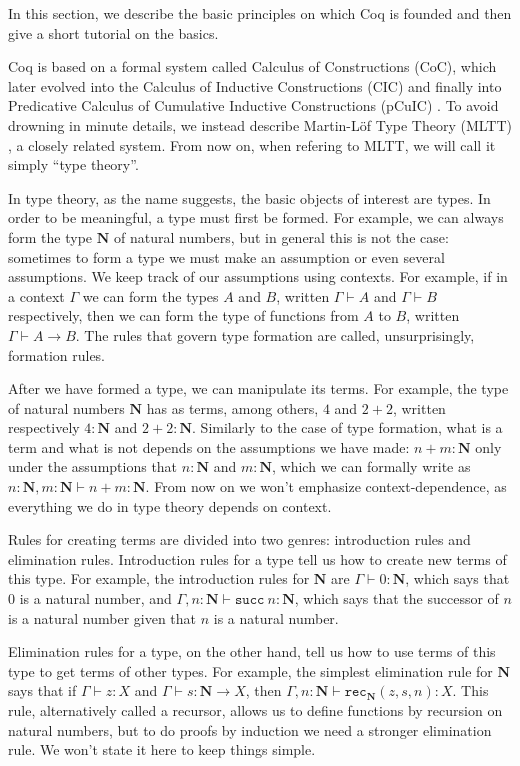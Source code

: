 \documentclass[declaration,mgr,english,shortabstract]{iithesis}
\newcommand{\m}[1]{\texttt{#1}}
\newcommand{\N}{\mathbf{N}}
\begin{document}
In this section, we describe the basic principles on which Coq is founded and then give a short tutorial on the basics.

Coq is based on a formal system called Calculus of Constructions (CoC)\cite{CoC}, which later evolved into the Calculus of Inductive Constructions (CIC) \cite{CIC} and finally into Predicative Calculus of Cumulative Inductive Constructions (pCuIC) \cite{pCuIC}. To avoid drowning in minute details, we instead describe Martin-L\"{o}f Type Theory (MLTT) \cite{MLTT1} \cite{MLTT2}, a closely related system. From now on, when refering to MLTT, we will call it simply ``type theory''.

In type theory, as the name suggests, the basic objects of interest are types. In order to be meaningful, a type must first be formed. For example, we can always form the type $\N$ of natural numbers, but in general this is not the case: sometimes to form a type we must make an assumption or even several assumptions. We keep track of our assumptions using contexts. For example, if in a context $\Gamma$ we can form the types $A$ and $B$, written $\Gamma \vdash A$ and $\Gamma \vdash B$ respectively, then we can form the type of functions from $A$ to $B$, written $\Gamma \vdash A \to B$. The rules that govern type formation are called, unsurprisingly, formation rules.

After we have formed a type, we can manipulate its terms. For example, the type of natural numbers $\N$ has as terms, among others, $4$ and $2 + 2$, written respectively $4 : \N$ and $2 + 2 : \N$. Similarly to the case of type formation, what is a term and what is not depends on the assumptions we have made: $n + m : \N$ only under the assumptions that $n : \N$ and $m : \N$, which we can formally write as $n : \N, m : \N \vdash n + m : \N$. From now on we won't emphasize context-dependence, as everything we do in type theory depends on context.

Rules for creating terms are divided into two genres: introduction rules and elimination rules. Introduction rules for a type tell us how to create new terms of this type. For example, the introduction rules for $\N$ are $\Gamma \vdash 0 : \N$, which says that $0$ is a natural number, and $\Gamma, n : \N \vdash \m{succ}\ n : \N$, which says that the successor of $n$ is a natural number given that $n$ is a natural number.

Elimination rules for a type, on the other hand, tell us how to use terms of this type to get terms of other types. For example, the simplest elimination rule for $\N$ says that if $\Gamma \vdash z : X$ and $\Gamma \vdash s : \N \to X$, then $\Gamma, n : \N \vdash \m{rec}_\N(z, s, n) : X$. This rule, alternatively called a recursor, allows us to define functions by recursion on natural numbers, but to do proofs by induction we need a stronger elimination rule. We won't state it here to keep things simple.
\end{document}
